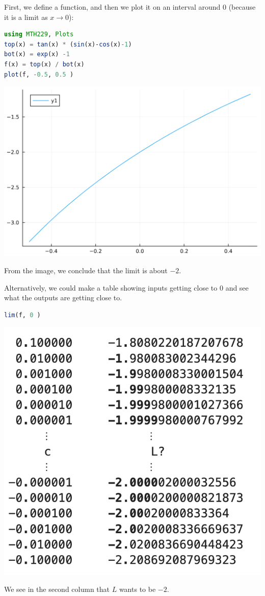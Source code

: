 \documentclass[12pt,answers]{book}
\begin{document}
\vspace{5mm}
First, we define a function, and then we plot it on an interval around 0 (because it is a limit as $x\to0$):\newline
\begin{minipage}{0.49\textwidth}
\begin{lstlisting}[language=Julia]
using MTH229, Plots
top(x) = tan(x) * (sin(x)-cos(x)-1)
bot(x) = exp(x) -1
f(x) = top(x) / bot(x)
plot(f, -0.5, 0.5 )
\end{lstlisting}
\end{minipage}
\begin{minipage}{0.49\textwidth}
\includegraphics[width=0.7\linewidth]{SkeletonNotes/05-graphics-1}
\end{minipage}\newline
From the image, we conclude that the limit is about $-2$.

Alternatively, we could make a table showing inputs getting close to 0 and see what the outputs are getting close to.\newline
\begin{minipage}{0.45\textwidth}
  \begin{lstlisting}[language=Julia]
    lim(f, 0 )
  \end{lstlisting}
\end{minipage}
\begin{minipage}{0.49\textwidth}
  \centering
  \includegraphics[width=0.6\linewidth]{SkeletonNotes/05-graphics-2}
\end{minipage}\newline
We see in the second column that $L$ wants to be $-2$.
\end{document}
